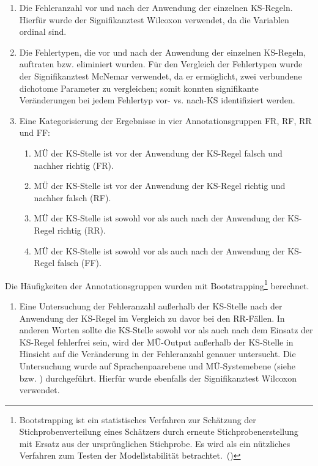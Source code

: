 \begin{enumerate}[label = {(\arabic*)}, align = left]
\item Die Fehleranzahl vor und nach der Anwendung der einzelnen KS-Regeln. Hierfür wurde der Signifikanztest Wilcoxon verwendet, da die Variablen ordinal sind.
\item Die Fehlertypen, die vor und nach der Anwendung der einzelnen KS-Re\-geln, auftraten bzw. eliminiert wurden. Für den Vergleich der Fehlertypen wurde der Signifikanztest McNemar verwendet, da er ermöglicht, zwei verbundene dichotome Parameter zu vergleichen; somit konnten signifikante Veränderungen bei jedem Fehlertyp vor- vs. nach-KS identifiziert werden.
\item Eine Kategorisierung der Ergebnisse in vier Annotationsgruppen FR, RF, RR und FF:

\begin{enumerate}[label = {(\alph*)}, align = left]
\item MÜ der KS-Stelle ist vor der Anwendung der KS-Regel falsch und nachher richtig (FR).
\item MÜ der KS-Stelle ist vor der Anwendung der KS-Regel richtig und nachher falsch (RF).
\item MÜ der KS-Stelle ist sowohl vor als auch nach der Anwendung der KS-Regel richtig (RR).
\item MÜ der KS-Stelle ist sowohl vor als auch nach der Anwendung der KS-Regel falsch (FF).
\end{enumerate}
\end{enumerate}

Die Häufigkeiten der Annotationsgruppen wurden mit Bootstrapping\footnote{{{{Bootstrapping ist ein statistisches Verfahren zur Schätzung der Stichprobenverteilung eines Schätzers durch erneute Stichprobenerstellung mit Ersatz aus der ursprünglichen Stichprobe. Es wird als ein nützliches Verfahren zum Testen der Modellstabilität betrachtet.~(\citealt{IBMnodate})}}}} berechnet.

\begin{enumerate}[label=(4),align=left]
\item Eine Untersuchung der Fehleranzahl außerhalb der KS-Stelle nach der Anwendung der KS-Regel im Vergleich zu davor bei den RR-Fällen. In anderen Worten sollte die KS-Stelle sowohl vor als auch nach dem Einsatz der KS-Regel fehlerfrei sein, wird der MÜ-Output außerhalb der KS-Stelle in Hinsicht auf die Veränderung in der Fehleranzahl genauer untersucht. Die Untersuchung wurde auf Sprachenpaarebene und MÜ-Systemebene (siehe  bzw. ) durchgeführt. Hierfür wurde ebenfalls der Signifikanztest Wilcoxon verwendet.
\end{enumerate}



